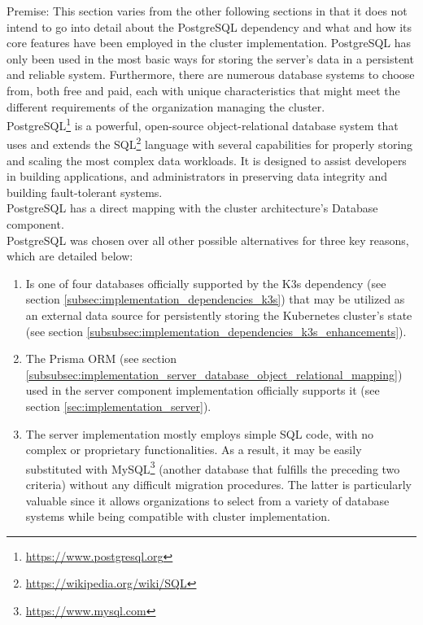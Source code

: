 Premise: This section varies from the other following sections in that it does not
intend to go into detail about the PostgreSQL dependency and what and how its core
features have been employed in the cluster implementation. PostgreSQL has only
been used in the most basic ways for storing the server's data in a persistent
and reliable system. Furthermore, there are numerous database systems to choose
from, both free and paid, each with unique characteristics that might meet the
different requirements of the organization managing the cluster. \\ %

PostgreSQL\footnote{\url{https://www.postgresql.org}} is a powerful, open-source
object-relational database system that uses and extends the SQL\footnote{\url{https://wikipedia.org/wiki/SQL}}
language with several capabilities for properly storing and scaling the most
complex data workloads. It is designed to assist developers in building applications,
and administrators in preserving data integrity and building fault-tolerant
systems\cite{postgresql}. \\ %
PostgreSQL has a direct mapping with the cluster architecture's Database component.
\\ %
PostgreSQL was chosen over all other possible alternatives for three key reasons,
which are detailed below:
\begin{enumerate}
  \item Is one of four databases officially supported by the K3s dependency (see
    section \ref{subsec:implementation_dependencies_k3s}) that may be utilized as
    an external data source for persistently storing the Kubernetes cluster's state
    (see section \ref{subsubsec:implementation_dependencies_k3s_enhancements}).

  \item The Prisma ORM (see section
    \ref{subsubsec:implementation_server_database_object_relational_mapping}) used
    in the server component implementation officially supports it (see section
    \ref{sec:implementation_server}).

  \item The server implementation mostly employs simple SQL code, with no
    complex or proprietary functionalities. As a result, it may be easily
    substituted with MySQL\footnote{\url{https://www.mysql.com}} (another database
    that fulfills the preceding two criteria) without any difficult migration
    procedures. The latter is particularly valuable since it allows organizations
    to select from a variety of database systems while being compatible with cluster
    implementation.
\end{enumerate}

